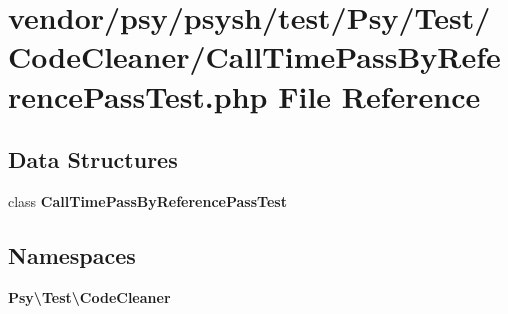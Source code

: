 \section{vendor/psy/psysh/test/\+Psy/\+Test/\+Code\+Cleaner/\+Call\+Time\+Pass\+By\+Reference\+Pass\+Test.php File Reference}
\label{_call_time_pass_by_reference_pass_test_8php}
\subsection*{Data Structures}
\begin{DoxyCompactItemize}
\item 
class {\bf Call\+Time\+Pass\+By\+Reference\+Pass\+Test}
\end{DoxyCompactItemize}
\subsection*{Namespaces}
\begin{DoxyCompactItemize}
\item 
 {\bf Psy\textbackslash{}\+Test\textbackslash{}\+Code\+Cleaner}
\end{DoxyCompactItemize}
